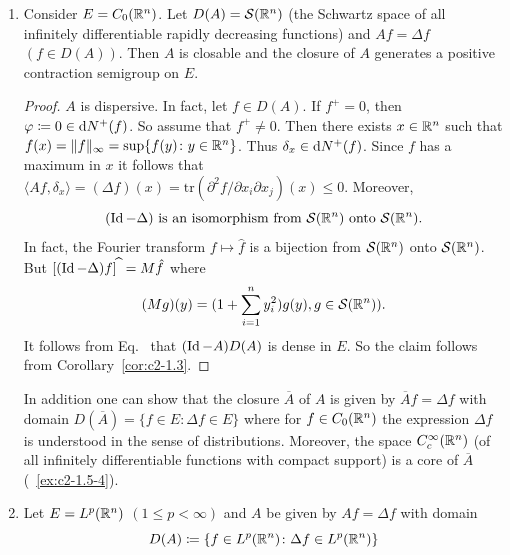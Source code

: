 \begin{examples}
\begin{enumerate}[\upshape (i), wide, labelindent=.25em]
\begin{proof}
We have shown that $A$ is dispersive. 
As in~\ref{ex:c2-1.5-1} one shows that $(\Id - A)$ is surjective. 
Now the claim follows from Theorem~\ref{thm:c2-1.2}.
\end{proof}
\item \label{ex:c2-1.5-3} 
Consider $E = C_{0}(\mathbb{R}^{n})$. 
Let $D(A) = \mathcal{S}(\mathbb{R}^{n})$ (the Schwartz space of all infinitely differentiable rapidly decreasing functions) and $Af = \Delta f$ $(f \in D(A))$. 
Then $A$ is closable and the closure of\/ $A$ generates a positive contraction semigroup on $E$.
\begin{proof}
$A$ is dispersive. 
In fact, let $f \in D(A)$. 
If\/ $f^{+} = 0$, then $\phi \coloneq 0 \in \diff{N^{+}}(f)$. 
So assume that $f^{+} \neq 0$. 
Then there exists $x \in \mathbb{R}^{n}$ such that $f(x) = \|f\|_{\infty} = \sup\{f(y) \colon y \in \mathbb{R}^{n}\}$. 
Thus $\delta_{x} \in \mathop{}\!\mathrm{d}{N^{+}}(f)$.
Since $f$ has a maximum in $x$ it follows that $\langle Af,\delta_{x} \rangle = (\Delta f)(x) = \text{tr}(\partial^{2}f/\partial x_{i}\partial x_{j})(x) \leq 0$. 
Moreover,
\begin{equation}\label{eq:c2-1.3}
(\operatorname{Id} - \Delta) \text{ is an isomorphism from } \mathcal{S}(\mathbb{R}^{n}) \text{ onto } \mathcal{S}(\mathbb{R}^{n}).
\end{equation}
In fact, the Fourier transform $f \mapsto \hat{f}$ is a bijection from $\mathcal{S}(\mathbb{R}^{n})$ onto $\mathcal{S}(\mathbb{R}^{n})$.
But $[(\operatorname{Id} - \Delta)f]^{\widehat{\ }} = M\hat{f}$ where 
\[
(Mg)(y) = (1 + \sum_{i=1}^{n} y_{i}^{2})g(y), g \in \mathcal{S}(\mathbb{R}^{n})) .
\]
It follows from Eq.~ that $(\operatorname{Id} - A)D(A)$ is dense in $E$. So the claim follows from Corollary~\ref{cor:c2-1.3}.
\end{proof}
\begin{remark*}\label{rem:c2-1.2}
%
In addition one can show that the closure $\overline{A}$ of\/ $A$ is given by $\overline{A}f = \Delta f$ with domain $D(\overline{A}) = \{f \in E \colon \Delta f \in E\}$ where for
$f \in C_{0}(\mathbb{R}^{n})$ the expression $\Delta f$ is understood in the sense of distributions. 
Moreover, the space $C_{c}^{\infty}(\mathbb{R}^{n})$ (of all infinitely differentiable functions with compact support) is a core of\/ $\overline{A}$ (\cf~\ref{ex:c2-1.5-4}).
\end{remark*}
\item \label{ex:c2-1.5-4} 
Let $E = L^{p}(\mathbb{R}^{n})$ $(1 \leq p < \infty)$ and $A$ be given by $Af = \Delta f$ with domain 
\[
D(A) \coloneq \{f \in L^{p}(\mathbb{R}^{n}) \colon \Delta f \in L^{p}(\mathbb{R}^{n})\}
\]
\end{enumerate}
\end{examples}
